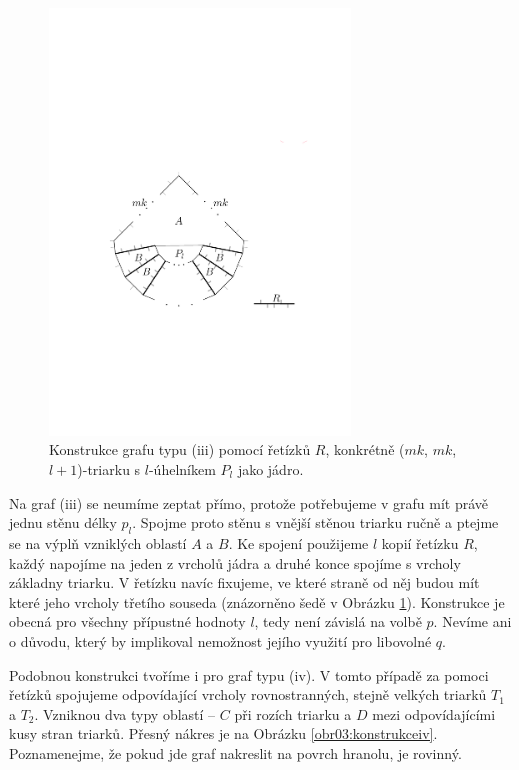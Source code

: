\begin{figure}[h]\centering
\includegraphics[width = 80mm]{../img/iii-construction}
\caption{Konstrukce grafu typu (iii) pomocí řetízků $R$, konkrétně ($mk$, $mk$, $l+1$)-triarku s $l$-úhelníkem $P_l$ jako jádro.}
\label{obr03:konstrukceiii}
\end{figure}

Na graf (iii) se neumíme zeptat přímo, protože potřebujeme v grafu mít právě jednu stěnu délky $p_l$. Spojme proto stěnu s vnější stěnou triarku ručně a ptejme se na výplň vzniklých oblastí $A$ a $B$. Ke spojení použijeme $l$ kopií řetízku $R$, každý napojíme na jeden z vrcholů jádra a druhé konce spojíme s  vrcholy základny triarku. V řetízku navíc fixujeme, ve které straně od něj budou mít které jeho vrcholy třetího souseda (znázorněno šedě v Obrázku \ref{obr03:konstrukceiii}). Konstrukce je obecná pro všechny přípustné hodnoty $l$, tedy není závislá na volbě $p$. Nevíme ani o důvodu, který by implikoval nemožnost jejího využití pro libovolné $q$.


Podobnou konstrukci tvoříme i pro graf typu (iv). V tomto případě za pomoci řetízků spojujeme odpovídající vrcholy rovnostranných, stejně velkých triarků $T_1$ a $T_2$. Vzniknou dva typy oblastí -- $C$ při rozích triarku a $D$ mezi odpovídajícími kusy stran triarků. Přesný nákres je na Obrázku \ref{obr03:konstrukceiv}. Poznamenejme, že pokud jde graf nakreslit na povrch hranolu, je rovinný. 

